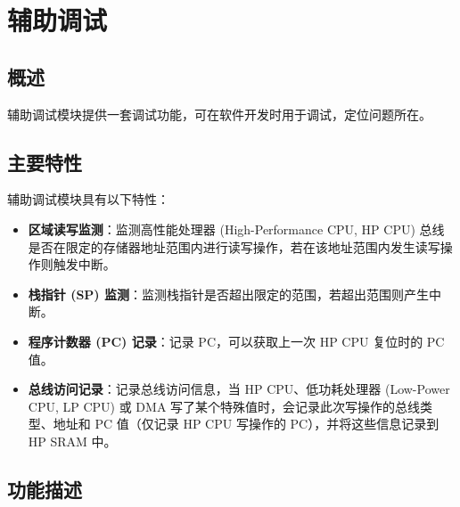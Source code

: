\documentclass[main\_\_CN.tex]{subfiles}
\begin{document}

\ifglobal
\else
    \listoftodos
    {\let\clearpage\relax \listofdonetodos}
    \tableofcontents
\fi




\chapter{辅助调试}
\label{mod:dbgassist}
\hypertarget{dbgassist}{}


\section{概述}

\chipname{} 辅助调试模块提供一套调试功能，可在软件开发时用于调试，定位问题所在。

\section{主要特性}
\label{sec:dbgassist-features}

辅助调试模块具有以下特性：

\begin{itemize}
    \item \textbf{区域读写监测}：监测高性能处理器 (High-Performance CPU, HP CPU) 总线是否在限定的存储器地址范围内进行读写操作，若在该地址范围内发生读写操作则触发中断。
    \item \textbf{栈指针 (SP) 监测}：监测栈指针是否超出限定的范围，若超出范围则产生中断。
    \item \textbf{程序计数器 (PC) 记录}：记录 PC，可以获取上一次 HP CPU 复位时的 PC 值。
    \item \textbf{总线访问记录}：记录总线访问信息，当 HP CPU、低功耗处理器 (Low-Power CPU, LP CPU) 或 DMA 写了某个特殊值时，会记录此次写操作的总线类型、地址和 PC 值（仅记录 HP CPU 写操作的 PC），并将这些信息记录到 HP SRAM 中。
\end{itemize}


\section{功能描述}
\label{sec:dbgassist-func-descr}
\end{document}
